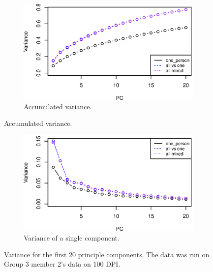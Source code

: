 \begin{figure}[H]
\centering
\begin{subfigure}{0.70\textwidth}
\centering
\includegraphics[width=\textwidth]{graphics/pca_acc_variance}
\caption{Accumulated variance.}
\label{fig:pca_accumulated_var}
\end{subfigure}
\end{figure}
\begin{figure}[H]
\centering
\ContinuedFloat
\begin{subfigure}{0.70\textwidth}
\centering
\includegraphics[width=\textwidth]{graphics/pca_variance}
\caption{Variance of a single component.}
\label{fig:pca_var}
\end{subfigure}
\caption[PCA variance.]{Variance for the first 20 principle components.
The data was run on Group 3 member 2's data on 100 DPI. }
\label{fig:variance}
\end{figure}


